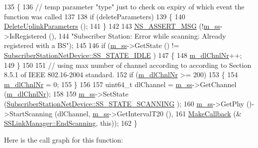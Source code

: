\begin{DoxyCode}
135 \{
136   \textcolor{comment}{// temp parameter "type" just to check on expiry of which event the function was called}
137 
138   \textcolor{keywordflow}{if} (deleteParameters)
139     \{
140       \hyperlink{classns3_1_1SSLinkManager_a0b3a123874557b7aec1d4b550530213b}{DeleteUplinkParameters} ();
141     \}
142 
143   \hyperlink{assert_8h_aff5ece9066c74e681e74999856f08539}{NS\_ASSERT\_MSG} (!\hyperlink{classns3_1_1SSLinkManager_a44506c63befdc33eb0e0b4ba7f93d498}{m\_ss}->IsRegistered (),
144                  \textcolor{stringliteral}{"Subscriber Station: Error while scanning: Already registered with a BS"});
145 
146   \textcolor{keywordflow}{if} (\hyperlink{classns3_1_1SSLinkManager_a44506c63befdc33eb0e0b4ba7f93d498}{m\_ss}->GetState () != \hyperlink{classns3_1_1SubscriberStationNetDevice_af9f145bc05df1f18610a3d4b61ff9ee4a746a6c26cc18630753a923ba121b4824}{SubscriberStationNetDevice::SS\_STATE\_IDLE}
      )
147     \{
148       \hyperlink{classns3_1_1SSLinkManager_abc85be3e99ffd493514b3f71617e795a}{m\_dlChnlNr}++;
149     \}
150 
151   \textcolor{comment}{// using max number of channel according to according to Section 8.5.1 of IEEE 802.16-2004 standard.}
152   \textcolor{keywordflow}{if} (\hyperlink{classns3_1_1SSLinkManager_abc85be3e99ffd493514b3f71617e795a}{m\_dlChnlNr} >= 200)
153     \{
154       \hyperlink{classns3_1_1SSLinkManager_abc85be3e99ffd493514b3f71617e795a}{m\_dlChnlNr} = 0;
155     \}
156 
157   uint64\_t dlChannel = \hyperlink{classns3_1_1SSLinkManager_a44506c63befdc33eb0e0b4ba7f93d498}{m\_ss}->GetChannel (\hyperlink{classns3_1_1SSLinkManager_abc85be3e99ffd493514b3f71617e795a}{m\_dlChnlNr});
158 
159   \hyperlink{classns3_1_1SSLinkManager_a44506c63befdc33eb0e0b4ba7f93d498}{m\_ss}->SetState (\hyperlink{classns3_1_1SubscriberStationNetDevice_af9f145bc05df1f18610a3d4b61ff9ee4a0eafcdd49c5f8b895597a76fa7d76aab}{SubscriberStationNetDevice::SS\_STATE\_SCANNING}
      );
160   \hyperlink{classns3_1_1SSLinkManager_a44506c63befdc33eb0e0b4ba7f93d498}{m\_ss}->GetPhy ()->StartScanning (dlChannel, \hyperlink{classns3_1_1SSLinkManager_a44506c63befdc33eb0e0b4ba7f93d498}{m\_ss}->GetIntervalT20 (),
161                                   \hyperlink{group__makecallbackmemptr_ga9376283685aa99d204048d6a4b7610a4}{MakeCallback} (&
      \hyperlink{classns3_1_1SSLinkManager_a302dfe1932eb44049069b7b12774f7ef}{SSLinkManager::EndScanning}, \textcolor{keyword}{this}));
162 \}
\end{DoxyCode}


Here is the call graph for this function\+:




